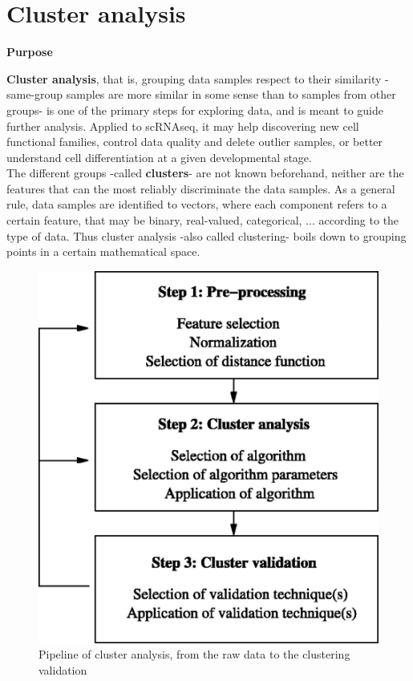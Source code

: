 \documentclass{report}
\begin{document}
\section{Cluster analysis}

\textbf{Purpose}
\bigskip

\textbf{Cluster analysis}, that is, grouping data samples respect to their similarity -same-group samples are more similar in some sense than to samples from other groups- is one of the primary steps for exploring data, and is meant to guide further analysis. Applied to scRNAseq, it may help discovering new cell functional families\cite{jiang2016giniclust}, control data quality\cite{mccarthy2016scater} and delete outlier samples\cite{kiselev2016sc3}, or better understand cell differentiation at a given developmental stage\cite{goolam2016heterogeneity}.\\

The different groups -called \textbf{clusters}- are not known beforehand, neither are the features that can the most reliably discriminate the data samples. As a general rule, data samples are identified to vectors, where each component refers to a certain feature, that may be binary, real-valued, categorical, ... according to the type of data. Thus cluster analysis -also called clustering- boils down to grouping points in a certain mathematical space.\\

\begin{figure}[H]
\centering
\includegraphics[scale=0.15]{illustrations/clusteranalysis.jpg}
\caption{Pipeline of cluster analysis, from the raw data to the clustering validation}
\label{clusteranalysis}
\end{figure}
\end{document}
